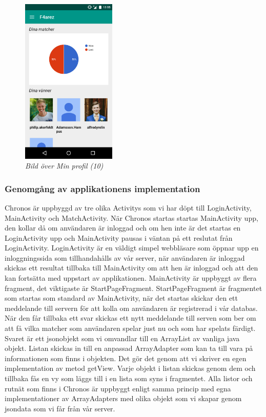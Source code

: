 \documentclass[a4paper, 11pt]{article}
\begin{document}
\begin{figure}[H]
	\begin{center}
	\includegraphics[width=0.4\textwidth]{app_profile} 
	\end{center}
	\caption{\textit{Bild över Min profil (10)}}
\end{figure}

\newpage

\subsubsection{Genomgång av applikationens implementation}

Chronos är uppbyggd av tre olika Activitys som vi har döpt till LoginActivity, MainActivity och MatchActivity. När Chronos startas startas MainActivity upp, den kollar då om användaren är inloggad och om hen inte är det startas en LoginActivity upp och MainActivity pausas i väntan på ett reslutat från LoginActivity. LoginActivity är en väldigt simpel webbläsare som öppnar upp en inloggningssida som tillhandahålls av vår server, när användaren är inloggad skickas ett resultat tillbaka till MainActivity om att hen är inloggad och att den kan fortsätta med uppstart av applikationen. 
MainActivity är uppbyggt av flera fragment, det viktigaste är StartPageFragment. StartPageFragment är fragmentet som startas som standard av MainActivity, när det startas skickar den ett meddelande till servern för att kolla om användaren är registrerad i vår databas. När den får tillbaka ett svar skickas ett nytt meddelande till serven som ber om att få vilka matcher som användaren spelar just nu och som har spelats färdigt. Svaret är ett jsonobjekt som vi omvandlar till en ArrayList av vanliga java objekt. Listan skickas in till en anpassad ArrayAdapter som kan ta till vara på informationen som finns i objekten. Det gör det genom att vi skriver en egen implementation av metod getView. Varje objekt i listan skickas genom dem och tillbaka fås en vy som läggs till i en lista som syns i fragmentet. Alla listor och rutnät som finns i Chronos är uppbyggt enligt samma princip med egna implementationer av ArrayAdapters med olika objekt som vi skapar genom jsondata som vi får från vår server.  
\end{document}
